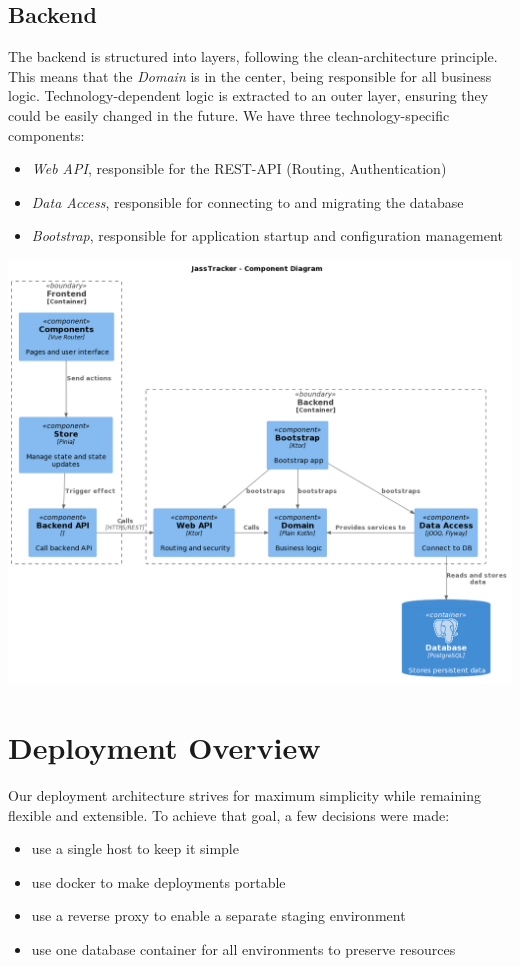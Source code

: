 \subsection{Backend}
The backend is structured into layers, following the clean-architecture principle.
This means that the \emph{Domain} is in the center, being responsible for all business logic.
Technology-dependent logic is extracted to an outer layer, ensuring they could be easily changed in the future.
We have three technology-specific components:
\begin{itemize}
    \item \emph{Web API}, responsible for the REST-API (Routing, Authentication)
    \item \emph{Data Access}, responsible for connecting to and migrating the database
    \item \emph{Bootstrap}, responsible for application startup and configuration management
\end{itemize}

\includegraphics[width=\textwidth]{resources/diagrams/c4-3-component}

\section{Deployment Overview}
\label{sec:architecture_deployment}
Our deployment architecture strives for maximum simplicity while remaining flexible and extensible.
To achieve that goal, a few decisions were made:
\begin{itemize}
    \item use a single host to keep it simple
    \item use docker to make deployments portable
    \item use a reverse proxy to enable a separate staging environment
    \item use one database container for all environments to preserve resources
\end{itemize}

